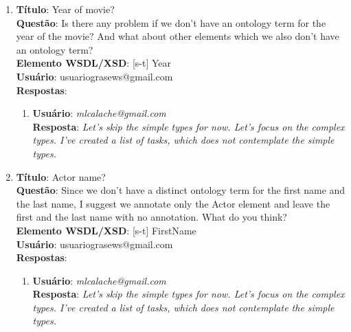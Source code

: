 \begin{tcolorbox}
    
    \begin{enumerate}[label=(Q\arabic*)]
        
        \setlength{\parskip}{0.55cm}
        
        \setcounter{enumi}{3}
        
        
        \item 
        \textbf{Título}: Year of movie?
        \\
        \textbf{Questão}: Is there any problem if we don’t have an ontology term for the year of the movie? And what about other elements which we also don’t have an ontology term?
        \\
        \textbf{Elemento WSDL/XSD}: [s-t] Year
        \\
        \textbf{Usuário}: usuariograsews@gmail.com
        \\
        \textbf{Respostas}:
        \begin{enumerate}
            \item
                \textbf{Usuário}: \textit{mlcalache@gmail.com}
                \\
                \textbf{Resposta}: \textit{Let's skip the simple types for now. Let's focus on the complex types. I've created a list of tasks, which does not contemplate the simple types.}
        \end{enumerate}
        
        
        \item 
        \textbf{Título}: Actor name?
        \\
        \textbf{Questão}: Since we don’t have a distinct ontology term for the first name and the last name, I suggest we annotate only the Actor element and leave the first and the last name with no annotation. What do you think?
        \\
        \textbf{Elemento WSDL/XSD}: [s-t] FirstName
        \\
        \textbf{Usuário}: usuariograsews@gmail.com
        \\
        \textbf{Respostas}:
        \begin{enumerate}
            \item
                \textbf{Usuário}: \textit{mlcalache@gmail.com}
                \\
                \textbf{Resposta}: \textit{Let's skip the simple types for now. Let's focus on the complex types. I've created a list of tasks, which does not contemplate the simple types.}
        \end{enumerate}
        

\end{enumerate}
\end{tcolorbox}
